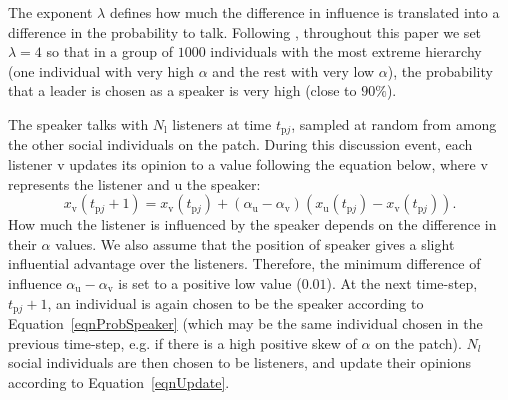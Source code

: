 \documentclass{rstb}
\begin{document}
\begin{linenumbers}
The exponent $\lambda$ defines how much the difference in influence is translated into a difference in the probability to talk. Following \cite{Perret:2020:a}, throughout this paper we set $\lambda = 4$ so that in a group of $1000$ individuals with the most extreme hierarchy (one individual with very high $\alpha$ and the rest with very low $\alpha$), the probability that a leader is chosen as a speaker is very high (close to $90\%$). 

The speaker talks with $N_\mathrm{l}$ listeners at time $t_{\mathrm{p}j}$, sampled at random from among the other social individuals on the patch. During this discussion event, each listener $\mathrm{v}$ updates its opinion to a value following the equation below, where $\mathrm{v}$ represents the listener and $\mathrm{u}$ the speaker:
\begin{equation}
x_\mathrm{v}(t_{\mathrm{p}j}+1) = x_\mathrm{v}(t_{\mathrm{p}j}) + (\alpha_\mathrm{u}-\alpha_\mathrm{v})(x_\mathrm{u}(t_{\mathrm{p}j}) - x_\mathrm{v}(t_{\mathrm{p}j})).
\label{eqnUpdate}
\end{equation}
How much the listener is influenced by the speaker depends on the difference in their $\alpha$ values. We also assume that the position of speaker gives a slight influential advantage over the listeners. Therefore, the minimum difference of influence $\alpha_\mathrm{u}-\alpha_\mathrm{v}$ is set to a positive low value ($0.01$). At the next time-step, $t_{\mathrm{p}j}+1$, an individual is again chosen to be the speaker according to Equation~\ref{eqnProbSpeaker} (which may be the same individual chosen in the previous time-step, e.g. if there is a high positive skew of $\alpha$ on the patch). $N_l$ social individuals are then chosen to be listeners, and update their opinions according to Equation~\ref{eqnUpdate}. 



\end{linenumbers}
\end{document}
